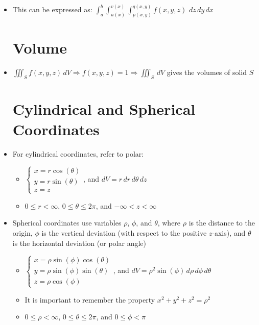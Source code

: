 \begin{itemize}
    \item This can be expressed as: $\displaystyle \int_a^b\int_{u(x)}^{v(x)}\int_{p(x,y)}^{q(x,y)} f(x,y,z)\,\,dz\,dy\,dx$

      \section{Volume}

    \item $\displaystyle \iiint_S f(x,y,z)\, dV\Rightarrow f(x,y,z) = 1 \Rightarrow \iiint_S\,dV$ gives the volumes of solid $S $

      \section{Cylindrical and Spherical Coordinates}

    \item For cylindrical coordinates, refer to polar:

      \begin{itemize}

        \item $\left\{\begin{array}{l} x=r\cos(\theta)\\ y=r\sin(\theta)\\ z=z \end{array}$, and $dV=r\,dr\,d\theta\,dz$

          \item $0\leq r < \infty$, $0\leq\theta\leq2\pi$, and $-\infty< z < \infty$

      \end{itemize}

    \item Spherical coordinates use variables $\rho$, $\phi$, and $\theta$, where $\rho$ is the distance to the origin, $\phi$ is the vertical deviation (with respect to the positive $z$-axis), and $\theta$ is the horizontal deviation (or polar angle)

      \begin{itemize}

        \item $\left\{\begin{array}{l} x = \rho\sin(\phi)\cos(\theta)\\ y = \rho\sin(\phi)\sin(\theta)\\ z = \rho\cos(\phi)  \end{array}$, and $dV=\rho^2\sin(\phi)\,d\rho\,d\phi\,d\theta$

        \item It is important to remember the property $x^2 + y^2 + z^2 = \rho^2$

          \item $0\leq \rho < \infty$, $0\leq\theta\leq2\pi$, and $0 \leq \phi < \pi$

      \end{itemize}

\end{itemize}



